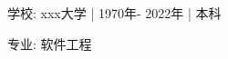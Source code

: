 

\begin{cventries}

  \cventry
    {} %
    {} %
    {} %
    {} %
    {
      \begin{cvitems} %
        \item {学校: xxx大学 | 1970年- 2022年 | 本科}
        \item {专业: 软件工程}
      \end{cvitems}
    }
\end{cventries}

